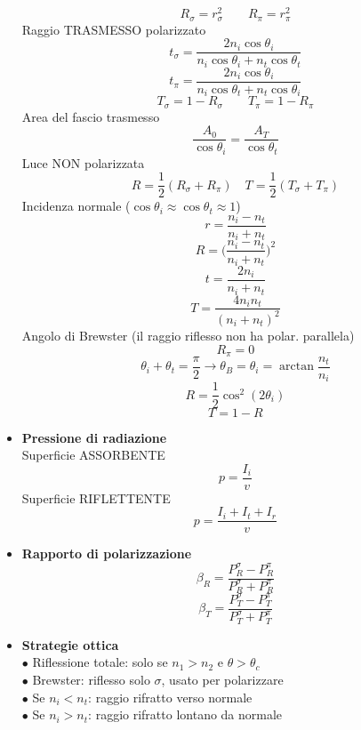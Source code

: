 \documentclass{book}
\newcommand{\g}{\textbf}
\newcommand{\e}{\begin{equation}}
\newcommand{\ex}{\end{equation} }
\renewcommand{\it}{\item[$\cdot$]}
\begin{document}
\begin{multicols}{4}
\begin{itemize}
        \e{R_\sigma=r_\sigma^2 \qquad R_\pi=r_\pi^2} \ex
        Raggio TRASMESSO polarizzato
        \e{t_\sigma=\frac{2n_i\cos\theta_i}{n_i\cos\theta_i+n_t\cos\theta_t}} \ex
        \e{t_\pi=\frac{2n_i\cos\theta_i}{n_i\cos\theta_t+n_t\cos\theta_i}} \ex
        \e{T_\sigma=1-R_\sigma \qquad T_\pi=1-R_\pi} \ex
        Area del fascio trasmesso
        \e{\frac{A_0}{\cos \theta_i} = \frac{A_T}{\cos \theta_t}}\ex
        Luce NON polarizzata
        \e{R=\frac{1}{2}(R_\sigma+R_\pi) \quad T=\frac{1}{2}(T_\sigma+T_\pi)} \ex
        Incidenza normale ($\cos\theta_i \approx \cos\theta_t \approx 1$)
        \e{r=\frac{n_i-n_t}{n_i+n_t}} \ex
        \e{R=\biggl(\frac{n_i-n_t}{n_i+n_t}\biggr)^2} \ex
        \e{t=\frac{2n_i}{n_i+n_t}} \ex
        \e{T=\frac{4n_in_t}{(n_i+n_t)^2}} \ex
        Angolo di Brewster (il raggio riflesso non ha polar. parallela)
        \e{R_\pi = 0}\ex
        \e{\theta_i+\theta_t=\frac{\pi}{2} \rightarrow \theta_B=\theta_i=\arctan\frac{n_t}{n_i}} \ex
        \e{R=\frac{1}{2}\cos^2(2\theta_i)} \ex
        \e{T=1-R} \ex
    \it \g{Pressione di radiazione} \\
        Superficie ASSORBENTE
        \e{p=\frac{I_i}{v}} \ex
        Superficie RIFLETTENTE
        \e{p=\frac{I_i+I_t+I_r}{v}} \ex
    \it \g{Rapporto di polarizzazione}
        \e{\beta_R=\frac{P_R^\sigma-P_R^\pi}{P_R^\sigma+P_R^\pi}} \ex
        \e{\beta_T=\frac{P_T^\sigma-P_T^\pi}{P_T^\sigma+P_T^\pi}} \ex
    \it \g{Strategie ottica} \\
        $\bullet$ Riflessione totale: solo se $n_1>n_2$ e $\theta>\theta_c$ \\
        $\bullet$ Brewster: riflesso solo $\sigma$, usato per polarizzare \\
        $\bullet$ Se $n_i<n_t$: raggio rifratto verso normale \\
        $\bullet$ Se $n_i>n_t$: raggio rifratto lontano da normale \\


\end{itemize}
\end{multicols}
\end{document}
